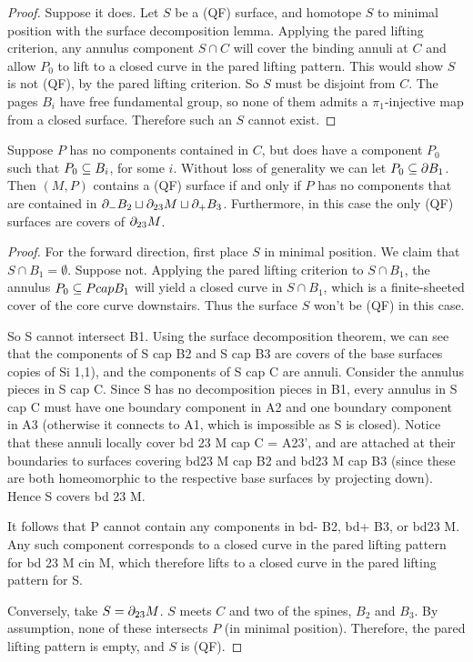 \begin{proof}

Suppose it does. Let $S$ be a (QF) surface, and homotope $S$ to minimal
position with the surface decomposition lemma. Applying the pared lifting
criterion, any annulus component $S \cap C$ will cover the binding annuli at
$C$ and allow $P_0$ to lift to a closed curve in the pared lifting pattern.
This would show $S$ is not (QF), by the pared lifting criterion. So $S$ must be
disjoint from $C$.  The pages $B_i$ have free fundamental group, so none of
them admits a $\pi_1$-injective map from a closed surface.  Therefore such an
$S$ cannot exist.

\end{proof}

\begin{prop}

Suppose $P$ has no components contained in $C$, but does have a component $P_0$
such that $P_0 \subseteq B_i$, for some $i$.  Without loss of generality we can let
$P_0 \subseteq \partial B_1$.  Then $(M,P)$ contains a (QF) surface if and only if $P$
has no components that are contained in $\partial_-B_2 \sqcup \partial_{23}M \sqcup
\partial_+B_3$. Furthermore, in this case the only (QF) surfaces are covers of
$\partial_{23}M$.

\end{prop}

\begin{proof}

For the forward direction, first place $S$ in minimal position. We claim that
$S\cap B_1=\emptyset$. Suppose not. Applying the pared lifting criterion to
$S\cap B_1$, the annulus $P_0\subseteq P cap B_1$ will yield a closed curve in
$S\cap B_1$, which is a finite-sheeted cover of the core curve downstairs. Thus
the surface $S$ won't be (QF) in this case.

So S cannot intersect B1. Using the surface decomposition theorem, we can see
that the components of S cap B2 and S cap B3 are covers of the base surfaces
copies of Si 1,1), and the components of S cap C are annuli.  Consider the
annulus pieces in S cap C.  Since S has no decomposition pieces in B1, every
annulus in S cap C must have one boundary component in A2 and one boundary
component in A3 (otherwise it connects to A1, which is impossible as S is
closed). Notice that these annuli locally cover bd 23 M cap C = A23', and are
attached at their boundaries to surfaces covering bd23 M cap B2 and bd23 M cap
B3 (since these are both homeomorphic to the respective base surfaces by
projecting down). Hence S covers bd 23 M.

It follows that P cannot contain any components in bd- B2, bd+ B3, or bd23 M.
Any such component corresponds to a closed curve in the pared lifting pattern
for bd 23 M cin M, which therefore lifts to a closed curve in the pared lifting
pattern for S.

Conversely, take $S=\partial_{23}M$.  $S$ meets $C$ and two of the spines, $B_2$ and
$B_3$.  By assumption, none of these intersects $P$ (in minimal position).
Therefore, the pared lifting pattern is empty, and $S$ is (QF).

\end{proof}

